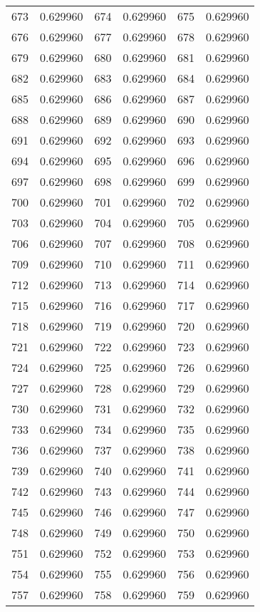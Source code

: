\documentclass[12pt]{article}
\begin{document}
\begin{longtable}{@{}cc|cc|cc@{}}
673 & 0.629960 & 674 & 0.629960 & 675 & 0.629960 \\
676 & 0.629960 & 677 & 0.629960 & 678 & 0.629960 \\
679 & 0.629960 & 680 & 0.629960 & 681 & 0.629960 \\
682 & 0.629960 & 683 & 0.629960 & 684 & 0.629960 \\
685 & 0.629960 & 686 & 0.629960 & 687 & 0.629960 \\
688 & 0.629960 & 689 & 0.629960 & 690 & 0.629960 \\
691 & 0.629960 & 692 & 0.629960 & 693 & 0.629960 \\
694 & 0.629960 & 695 & 0.629960 & 696 & 0.629960 \\
697 & 0.629960 & 698 & 0.629960 & 699 & 0.629960 \\
700 & 0.629960 & 701 & 0.629960 & 702 & 0.629960 \\
703 & 0.629960 & 704 & 0.629960 & 705 & 0.629960 \\
706 & 0.629960 & 707 & 0.629960 & 708 & 0.629960 \\
709 & 0.629960 & 710 & 0.629960 & 711 & 0.629960 \\
712 & 0.629960 & 713 & 0.629960 & 714 & 0.629960 \\
715 & 0.629960 & 716 & 0.629960 & 717 & 0.629960 \\
718 & 0.629960 & 719 & 0.629960 & 720 & 0.629960 \\
721 & 0.629960 & 722 & 0.629960 & 723 & 0.629960 \\
724 & 0.629960 & 725 & 0.629960 & 726 & 0.629960 \\
727 & 0.629960 & 728 & 0.629960 & 729 & 0.629960 \\
730 & 0.629960 & 731 & 0.629960 & 732 & 0.629960 \\
733 & 0.629960 & 734 & 0.629960 & 735 & 0.629960 \\
736 & 0.629960 & 737 & 0.629960 & 738 & 0.629960 \\
739 & 0.629960 & 740 & 0.629960 & 741 & 0.629960 \\
742 & 0.629960 & 743 & 0.629960 & 744 & 0.629960 \\
745 & 0.629960 & 746 & 0.629960 & 747 & 0.629960 \\
748 & 0.629960 & 749 & 0.629960 & 750 & 0.629960 \\
751 & 0.629960 & 752 & 0.629960 & 753 & 0.629960 \\
754 & 0.629960 & 755 & 0.629960 & 756 & 0.629960 \\
757 & 0.629960 & 758 & 0.629960 & 759 & 0.629960 \\

\end{longtable}
\end{document}
